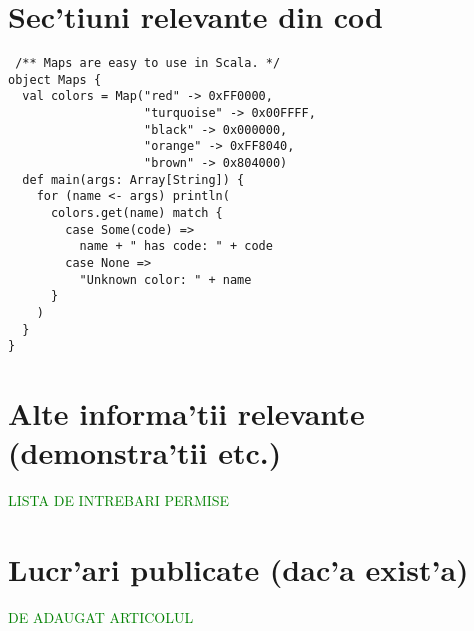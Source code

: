 \appendix
\chapter{Sec'tiuni relevante din cod}

\begin{verbatim}
 /** Maps are easy to use in Scala. */
object Maps {
  val colors = Map("red" -> 0xFF0000,
                   "turquoise" -> 0x00FFFF,
                   "black" -> 0x000000,
                   "orange" -> 0xFF8040,
                   "brown" -> 0x804000)
  def main(args: Array[String]) {
    for (name <- args) println(
      colors.get(name) match {
        case Some(code) =>
          name + " has code: " + code
        case None =>
          "Unknown color: " + name
      }
    )
  }
}
\end{verbatim}

\chapter{Alte informa'tii relevante (demonstra'tii etc.)}

\textcolor{green}{LISTA DE INTREBARI PERMISE}

\chapter{Lucr'ari publicate (dac'a exist'a)}

\textcolor{green}{DE ADAUGAT ARTICOLUL}
